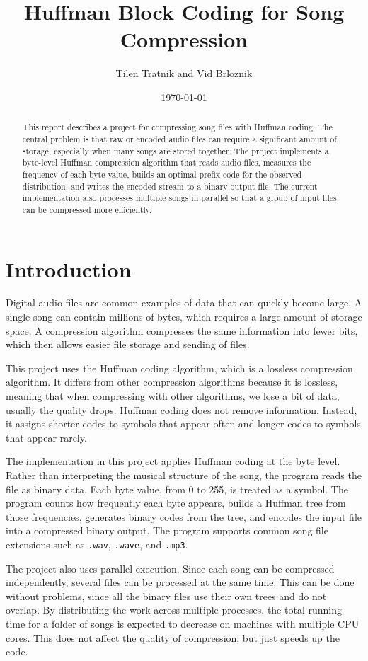 \documentclass[11pt,a4paper]{article}
\title{Huffman Block Coding for Song Compression}
\author{Tilen Tratnik and Vid Brloznik}
\date{\today}
\begin{document}
\maketitle

\begin{abstract}
This report describes a project for compressing song files with Huffman coding.
The central problem is that raw or encoded audio files can require a significant
amount of storage, especially when many songs are stored together. The project
implements a byte-level Huffman compression algorithm that reads audio files, measures the
frequency of each byte value, builds an optimal prefix code for the observed
distribution, and writes the encoded stream to a binary output file. The current
implementation also processes multiple songs in parallel so that a group of
input files can be compressed more efficiently.
\end{abstract}

\section{Introduction}

Digital audio files are common examples of data that can quickly become large.
A single song can contain millions of bytes, which
requires a large amount of storage space.
A compression algorithm compresses the same information into fewer bits, which then allows easier file storage and sending of files.

This project uses the Huffman coding algorithm, which is a lossless compression algorithm. It differs from other compression algorithms because it is lossless, meaning that when compressing with other algorithms, we lose a bit of data, usually the quality drops. Huffman
coding does not remove information. Instead, it assigns shorter codes to symbols
that appear often and longer codes to symbols that appear rarely.

The implementation in this project applies Huffman coding at the byte level.
Rather than interpreting the musical structure of the song, the program reads
the file as binary data. Each byte value, from 0 to 255, is treated as a symbol.
The program counts how frequently each byte appears, builds a Huffman tree from
those frequencies, generates binary codes from the tree, and encodes the input
file into a compressed binary output. The program supports common song file
extensions such as \texttt{.wav}, \texttt{.wave}, and \texttt{.mp3}.

The project also uses parallel execution. Since each song can be compressed
independently, several files can be processed at the same time. This can be done without problems, since all the binary files use their own trees and do not overlap. By distributing the work across multiple
processes, the total running time for a folder of songs is expected to decrease
on machines with multiple CPU cores. This does not affect the quality of compression, but just speeds up the code.
\end{document}
